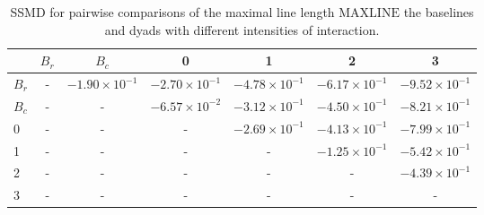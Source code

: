 \begin{table}
\centering
\caption{SSMD for pairwise comparisons of the maximal line length $\text{MAXLINE}$  the baselines and dyads with different intensities of interaction.}
\label{tab:ssmd_maxline}
\begin{tabular}{lcccccc}
\toprule
 & $B_r$ & $B_c$ & 0 & 1 & 2 & 3 \\
\midrule
$B_r$ & - & $-1.90 \times 10^{-1}$ & $-2.70 \times 10^{-1}$ & $-4.78 \times 10^{-1}$ & $-6.17 \times 10^{-1}$ & $-9.52 \times 10^{-1}$ \\
$B_c$ & - & - & $-6.57 \times 10^{-2}$ & $-3.12 \times 10^{-1}$ & $-4.50 \times 10^{-1}$ & $-8.21 \times 10^{-1}$ \\
0 & - & - & - & $-2.69 \times 10^{-1}$ & $-4.13 \times 10^{-1}$ & $-7.99 \times 10^{-1}$ \\
1 & - & - & - & - & $-1.25 \times 10^{-1}$ & $-5.42 \times 10^{-1}$ \\
2 & - & - & - & - & - & $-4.39 \times 10^{-1}$ \\
3 & - & - & - & - & - & - \\
\bottomrule
\end{tabular}
\end{table}
